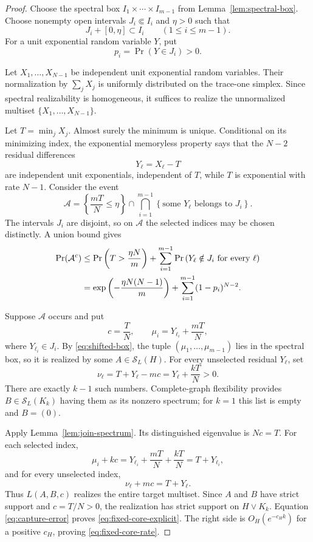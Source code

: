 \documentclass[11pt,reqno]{amsart}
\theoremstyle{definition}
\theoremstyle{remark}
\newcommand{\SL}{\mathcal S_L}
\begin{document}
\begin{proof}
Choose the spectral box $I_1\times\cdots\times I_{m-1}$ from
Lemma~\ref{lem:spectral-box}.  Choose nonempty open intervals
$J_i\Subset I_i$ and $\eta>0$ such that
\begin{equation}\label{eq:shifted-box}
  J_i+[0,\eta]\subset I_i
  \qquad(1\le i\le m-1).
\end{equation}
For a unit exponential random variable $Y$, put
\[
  p_i=\Pr(Y\in J_i)>0.
\]

Let $X_1,\ldots,X_{N-1}$ be independent unit exponential random variables.
Their normalization by $\sum_jX_j$ is uniformly distributed on the
trace-one simplex.  Since spectral realizability is homogeneous, it suffices
to realize the unnormalized multiset $\{X_1,\ldots,X_{N-1}\}$.

Let $T=\min_jX_j$.  Almost surely the minimum is unique.  Conditional on
its minimizing index, the exponential memoryless property says that the
$N-2$ residual differences
\[
  Y_\ell=X_\ell-T
\]
are independent unit exponentials, independent of $T$, while $T$ is
exponential with rate $N-1$.  Consider the event
\begin{equation}\label{eq:capture-event}
  \mathcal A=
  \left\{\frac{mT}{N}\le\eta\right\}
  \cap
  \bigcap_{i=1}^{m-1}
  \left\{\text{some $Y_\ell$ belongs to $J_i$}\right\}.
\end{equation}
The intervals $J_i$ are disjoint, so on $\mathcal A$ the selected indices
may be chosen distinctly.  A union bound gives
\begin{align}
  \Pr(\mathcal A^c)
  &\le
  \Pr\left(T>\frac{\eta N}{m}\right)
  +
  \sum_{i=1}^{m-1}
  \Pr\left(Y_\ell\notin J_i\text{ for every }\ell\right)\notag\\
  &=
  \exp\left(-\frac{\eta N(N-1)}m\right)
  +
  \sum_{i=1}^{m-1}(1-p_i)^{N-2}.
  \label{eq:capture-error}
\end{align}

Suppose $\mathcal A$ occurs and put
\[
  c=\frac{T}{N},
  \qquad
  \mu_i=Y_{\ell_i}+\frac{mT}{N},
\]
where $Y_{\ell_i}\in J_i$.  By \eqref{eq:shifted-box}, the tuple
$(\mu_1,\ldots,\mu_{m-1})$ lies in the spectral box, so it is realized by
some $A\in\SL(H)$.  For every unselected residual $Y_\ell$, set
\[
  \nu_\ell=T+Y_\ell-mc
  =Y_\ell+\frac{kT}{N}>0.
\]
There are exactly $k-1$ such numbers.  Complete-graph flexibility
\cite[Theorem~2.5]{FGL2025} provides $B\in\SL(K_k)$ having them as its
nonzero spectrum; for $k=1$ this list is empty and $B=(0)$.

Apply Lemma~\ref{lem:join-spectrum}.  Its distinguished eigenvalue is
$Nc=T$.  For each selected index,
\[
  \mu_i+kc
  =Y_{\ell_i}+\frac{mT}{N}+\frac{kT}{N}
  =T+Y_{\ell_i},
\]
and for every unselected index,
\[
  \nu_\ell+mc=T+Y_\ell.
\]
Thus $L(A,B,c)$ realizes the entire target multiset.  Since $A$ and $B$ have
strict support and $c=T/N>0$, the realization has strict support on
$H\vee K_k$.  Equation \eqref{eq:capture-error} proves
\eqref{eq:fixed-core-explicit}.  The right side is $O_H(e^{-c_Hk})$ for a
positive $c_H$, proving \eqref{eq:fixed-core-rate}.
\end{proof}
\end{document}
